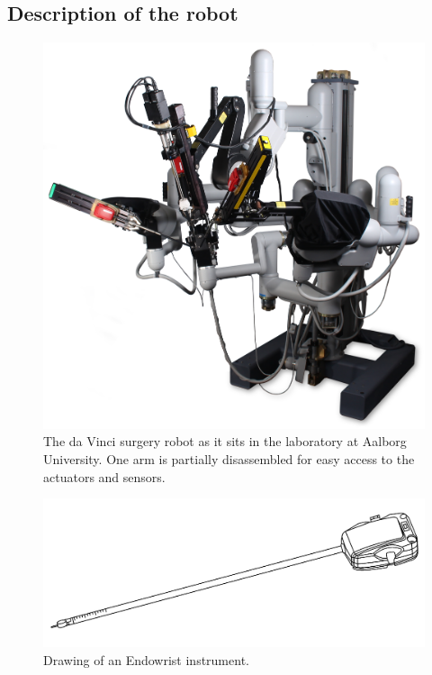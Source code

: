 \documentclass[a4paper, 10 pt, conference]{ieeeconf}      %
\begin{document}
\subsection{Description of the robot}

\begin{figure}[t]
    \centering
       \includegraphics[width=0.7\linewidth]{graphics/patient_cart.png}
    \caption{The da Vinci surgery robot as it sits in the laboratory at Aalborg University. One arm is partially disassembled for easy access to the actuators and sensors. \label{fig:patient_cart}}
\end{figure}


\begin{figure}[t]
    \centering
       \includegraphics[width=0.8\linewidth]{graphics/US08834489-20140916-D00004-instrument-cutout}
    \caption{Drawing of an Endowrist instrument. \label{fig:instrument}}
\end{figure}
\end{document}
